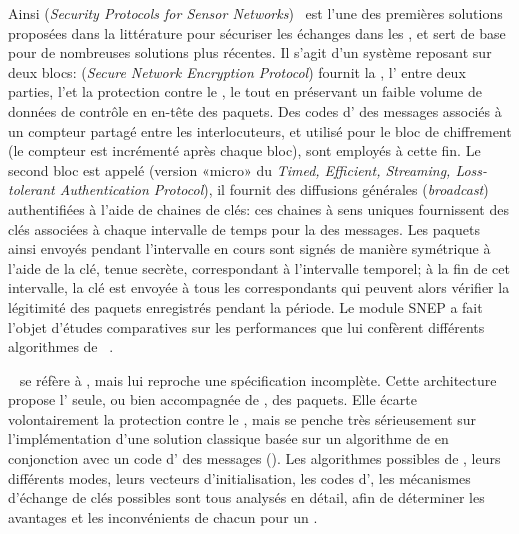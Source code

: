 Ainsi  (\textit{Security Protocols for Sensor Networks})~\cite{PSWCT02} est l'une des premières solutions proposées dans la littérature pour sécuriser les échanges dans les \rcs, et sert de base pour de nombreuses solutions plus récentes.
Il s'agit d'un système reposant sur deux blocs:  (\textit{Secure Network Encryption Protocol}) fournit la , l' entre deux parties, l'\integrite et la protection contre le , le tout en préservant un faible volume de données de contrôle en en-tête des paquets.
Des codes d' des messages associés à un compteur partagé entre les interlocuteurs, et utilisé pour le bloc de chiffrement (le compteur est incrémenté après chaque bloc), sont employés à cette fin.
Le second bloc est appelé  (version «micro» du \textit{Timed, Efficient, Streaming, Loss-tolerant Authentication Protocol}), il fournit des diffusions générales (\textit{broadcast}) authentifiées à l'aide de chaines de clés: ces chaines à sens uniques fournissent des clés associées à chaque intervalle de temps pour la  des messages.
Les paquets ainsi envoyés pendant l'intervalle en cours sont signés de manière symétrique à l'aide de la clé, tenue secrète, correspondant à l'intervalle temporel; à la fin de cet intervalle, la clé est envoyée à tous les correspondants qui peuvent alors vérifier la légitimité des paquets enregistrés pendant la période.
Le module SNEP a fait l'objet d'études comparatives sur les performances que lui confèrent différents algorithmes de ~\cite{SS14-snep}.

~\cite{KSW04} se réfère à , mais lui reproche une spécification incomplète.
Cette architecture propose l' seule, ou bien accompagnée de , des paquets.
Elle écarte volontairement la protection contre le , mais se penche très sérieusement sur l'implémentation d'une solution classique basée sur un algorithme de  en conjonction avec un code d' des messages (\macc).
Les algorithmes possibles de , leurs différents modes, leurs vecteurs d'initialisation, les codes d', les mécanismes d'échange de clés possibles sont tous analysés en détail, afin de déterminer les avantages et les inconvénients de chacun pour un \rc.

